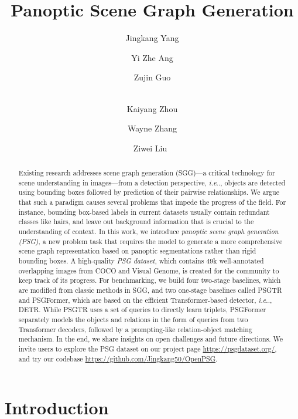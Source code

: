 \documentclass[runningheads]{llncs}
\makeatletter
\DeclareRobustCommand\onedot{\futurelet\@let@token\@onedot}
\def\@onedot{\ifx\@let@token.\else.\null\fi\xspace}
\def\ie{\emph{i.e}\onedot} \def\Ie{\emph{I.e}\onedot}
\makeatother
\begin{document}
\pagestyle{headings}
\mainmatter
\def\ECCVSubNumber{222}  \title{Panoptic Scene Graph Generation}

\begin{comment}
\titlerunning{ECCV-22 submission ID \ECCVSubNumber} 
\authorrunning{ECCV-22 submission ID \ECCVSubNumber} 
\author{Anonymous ECCV submission}
\institute{Paper ID \ECCVSubNumber}
\end{comment}


\author{Jingkang Yang \and
Yi Zhe Ang \and
Zujin Guo \and\\
Kaiyang Zhou \and
Wayne Zhang \and
Ziwei Liu~\textsuperscript{\Letter}}
\maketitle
\begin{abstract}
Existing research addresses scene graph generation (SGG)---a critical technology for scene understanding in images---from a detection perspective, \ie, objects are detected using bounding boxes followed by prediction of their pairwise relationships. We argue that such a paradigm causes several problems that impede the progress of the field. For instance, bounding box-based labels in current datasets usually contain redundant classes like hairs, and leave out background information that is crucial to the understanding of context. In this work, we introduce \emph{panoptic scene graph generation (PSG)}, a new problem task that requires the model to generate a more comprehensive scene graph representation based on panoptic segmentations rather than rigid bounding boxes. A high-quality \emph{PSG dataset}, which contains 49k well-annotated overlapping images from COCO and Visual Genome, is created for the community to keep track of its progress. For benchmarking, we build four two-stage baselines, which are modified from classic methods in SGG, and two one-stage baselines called PSGTR and PSGFormer, which are based on the efficient Transformer-based detector, \ie, DETR. 
While PSGTR uses a set of queries to directly learn triplets, PSGFormer separately models the objects and relations in the form of queries from two Transformer decoders, followed by a prompting-like relation-object matching mechanism. In the end, we share insights on open challenges and future directions. We invite users to explore the PSG dataset on our project page \url{https://psgdataset.org/}, and try our codebase \url{https://github.com/Jingkang50/OpenPSG}. 
\end{abstract} \section{Introduction}
\label{sec:intro}
\end{document}
